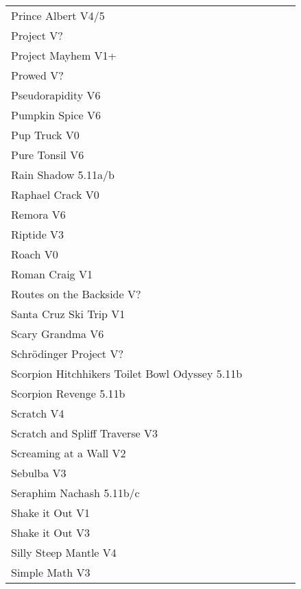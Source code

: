 \begin{flushleft}
\begin{center}
\begin{supertabular}{p{0.76\linewidth}p{0.08\linewidth}}
Prince Albert V4/5 & \pageref{rt:Prince Albert} \\
Project V? & \pageref{rt:Machete 3} \\
Project Mayhem V1+ & \pageref{rt:Project Mayhem} \\
Prowed V? & \pageref{vr:Prowed} \\
Pseudorapidity V6 & \pageref{rt:Pseudorapidity} \\
Pumpkin Spice V6 & \pageref{rt:Pumpkin Spice} \\
Pup Truck V0 & \pageref{rt:Pup Truck} \\
Pure Tonsil V6 & \pageref{vr:Pure Tonsil} \\
Rain Shadow 5.11a/b & \pageref{rt:Rain Shadow} \\
Raphael Crack V0 & \pageref{rt:Raphael Crack} \\
Remora V6 & \pageref{rt:Remora} \\
Riptide V3 & \pageref{rt:Riptide} \\
Roach V0 & \pageref{rt:Roach} \\
Roman Craig V1 & \pageref{rt:Roman Craig} \\
Routes on the Backside V? & \pageref{rt:Backside of Office} \\
Santa Cruz Ski Trip V1 & \pageref{rt:Santa Cruz Ski Trip} \\
Scary Grandma V6 & \pageref{rt:Scary Grandma} \\
Schrödinger Project V? & \pageref{rt:Schrödinger Project} \\
Scorpion Hitchhikers Toilet Bowl Odyssey 5.11b & \pageref{rt:Scorpion Hitchhikers Toilet Bowl Odyssey} \\
Scorpion Revenge 5.11b & \pageref{rt:Scorpion Revenge} \\
Scratch V4 & \pageref{rt:Scratch} \\
Scratch and Spliff Traverse V3 & \pageref{rt:Scratch and Spliff Traverse} \\
Screaming at a Wall V2 & \pageref{rt:Screaming at a Wall} \\
Sebulba V3 & \pageref{vr:Sebulba} \\
Seraphim Nachash 5.11b/c & \pageref{rt:Seraphim Nachash} \\
Shake it Out V1 & \pageref{rt:Shake it Out Frank} \\
Shake it Out V3 & \pageref{vr:Shake it Out} \\
Silly Steep Mantle V4 & \pageref{rt:Silly Steep Mantle} \\
Simple Math V3 & \pageref{rt:Simple Math} \\

\end{supertabular}
\end{center}
\end{flushleft}
